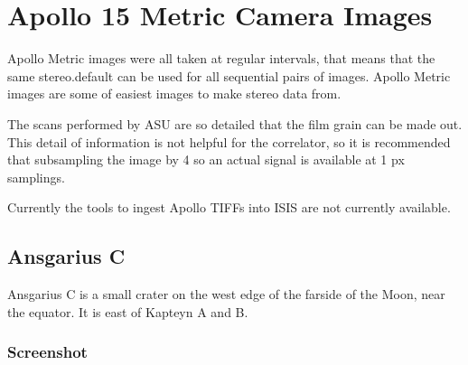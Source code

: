 \section{Apollo 15 Metric Camera Images}

Apollo Metric images were all taken at regular intervals, that means
that the same stereo.default can be used for all sequential pairs of
images. Apollo Metric images are some of easiest images to make stereo
data from.

The scans performed by ASU are so detailed that the film grain can be
made out. This detail of information is not helpful for the
correlator, so it is recommended that subsampling the image by 4 so an
actual signal is available at 1 px samplings.

Currently the tools to ingest Apollo TIFFs into ISIS are not currently
available.

\subsection{Ansgarius C}

Ansgarius C is a small crater on the west edge of the farside of the
Moon, near the equator. It is east of Kapteyn A and B.

\subsubsection*{Screenshot}

